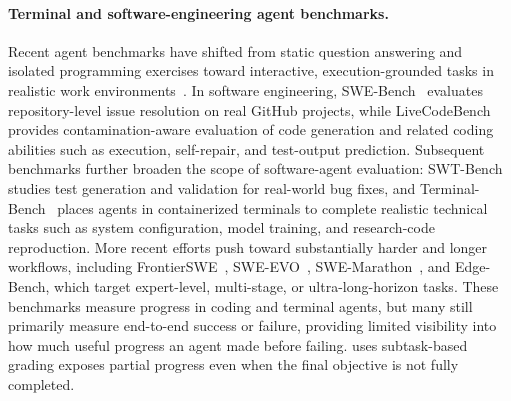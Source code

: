 \paragraph{Terminal and software-engineering agent benchmarks.}
Recent agent benchmarks have shifted from static question answering and isolated programming exercises toward interactive, execution-grounded tasks in realistic work environments~\cite{zhou2023webarena,xie2024osworld}.
%
In software engineering, SWE-Bench~\cite{jimenez2024swebench} evaluates repository-level issue resolution on real GitHub projects, while LiveCodeBench~\cite{jain2024livecodebench} provides contamination-aware evaluation of code generation and related coding abilities such as execution, self-repair, and test-output prediction.
%
Subsequent benchmarks further broaden the scope of software-agent evaluation: SWT-Bench~\cite{mundler2024swt} studies test generation and validation for real-world bug fixes, and Terminal-Bench~\cite{merrill2026terminalbenchbenchmarkingagentshard} places agents in containerized terminals to complete realistic technical tasks such as system configuration, model training, and research-code reproduction.
%
More recent efforts push toward substantially harder and longer workflows, including FrontierSWE~\cite{frontierswe2026}, SWE-EVO~\cite{le2025swe}, SWE-Marathon~\cite{desai2026swemarathon}, and Edge-Bench, which target expert-level, multi-stage, or ultra-long-horizon tasks.
%
These benchmarks measure progress in coding and terminal agents, but many still primarily measure end-to-end success or failure, providing limited visibility into how much useful progress an agent made before failing.
%
\ours{} uses subtask-based grading exposes partial progress even when the final objective is not fully completed.




